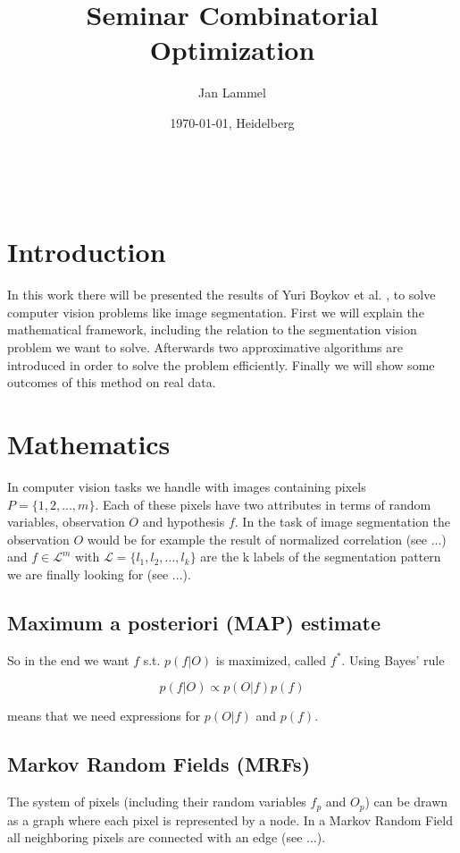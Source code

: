 \documentclass{scrartcl}[12pt, halfparskip]
\title{Seminar Combinatorial Optimization}
\author{Jan Lammel}
\date{\today{}, Heidelberg}
\begin{document}
\maketitle \ \\ 
\newpage


\section{Introduction}
In this work there will be presented the results of Yuri Boykov et al. \cite{boykov98}, \cite{boykov01} to solve computer vision problems like image segmentation. First we will explain the mathematical framework, including the relation to the segmentation vision problem we want to solve. Afterwards two approximative algorithms are introduced in order to solve the problem efficiently. Finally we will show some outcomes of this method on real data.


\section{Mathematics}
In computer vision tasks we handle with images containing pixels $P = \{ 1, 2, ..., m \}$. Each of these pixels have two attributes in terms of random variables, observation $O$ and hypothesis $f$. In the task of image segmentation the observation $O$ would be for example the result of normalized correlation (see ...) and $f \in \mathcal{L}^m$ with $\mathcal{L} = \{l_1,l_ 2, ..., l_k\}$ are the k labels of the segmentation pattern we are finally looking for (see ...). \\


\subsection{Maximum a posteriori (MAP) estimate}

So in the end we want $f$ s.t. $p(f|O)$ is maximized, called $f^*$. Using Bayes' rule

\begin{equation}
	p(f|O) \propto p(O|f) p(f)
\end{equation}

means that we need expressions for $p(O|f)$ and $p(f)$.


\subsection{Markov Random Fields (MRFs)}
The system of pixels (including their random variables $f_p$ and $O_p$) can be drawn as a graph where each pixel is represented by a node. In a Markov Random Field all neighboring pixels are connected with an edge (see ...). 
\end{document}
